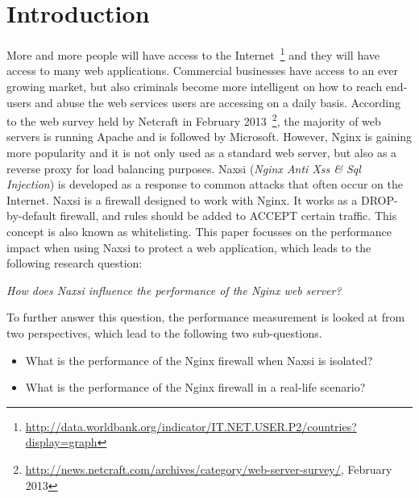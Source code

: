 \documentclass[Introduction]{subfiles}
\begin{document}
\section{Introduction}
\label{sec:Introduction}
More and more people will have access to the Internet~\footnote{\url{http://data.worldbank.org/indicator/IT.NET.USER.P2/countries?display=graph}} and they will have access to many web applications. Commercial businesses have access to an ever growing market, but also criminals become more intelligent on how to reach end-users and abuse the web services users are accessing on a daily basis.
According to the web survey held by Netcraft in February 2013~\footnote{\url{http://news.netcraft.com/archives/category/web-server-survey/}, February 2013}, the majority of web servers is running Apache and is followed by Microsoft. However, Nginx is gaining more popularity and it is not only used as a standard web server, but also as a reverse proxy for load balancing purposes. Naxsi (\emph{Nginx Anti Xss \& Sql Injection}) is developed as a response to common attacks that often occur on the Internet. Naxsi is a firewall designed to work with Nginx. It works as a DROP-by-default firewall, and rules should be added to ACCEPT certain traffic. This concept is also known as whitelisting. This paper focusses on the performance impact when using Naxsi to protect a web application, which leads to the following research question:


\begin{center}
\emph{How does Naxsi influence the performance of the Nginx web server?} 
\end{center}

\noindent
To further answer this question, the performance measurement is looked at from two perspectives, which lead to the following two sub-questions.

\begin{itemize}
\item What is the performance of the Nginx firewall when Naxsi is isolated?
\item What is the performance of the Nginx firewall in a real-life scenario?
\end{itemize}

\end{document}
